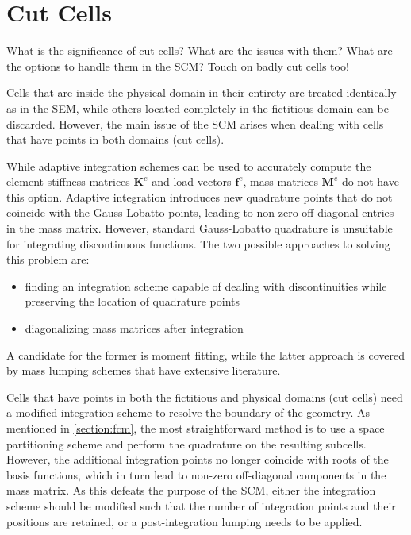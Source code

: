 %
\section{Cut Cells}
\label{section:cutcells}
%

What is the significance of cut cells?
What are the issues with them?
What are the options to handle them in the SCM?
Touch on badly cut cells too!

Cells that are inside the physical domain in their entirety are treated identically as in the SEM, while others located completely in the fictitious domain can be discarded. However, the main issue of the SCM arises when dealing with cells that have points in both domains (cut cells).

While adaptive integration schemes can be used to accurately compute the element stiffness matrices $\mathbf K^e$ and load vectors $\mathbf f^e$, mass matrices $\mathbf M^e$ do not have this option. Adaptive integration introduces new quadrature points that do not coincide with the Gauss-Lobatto points, leading to non-zero off-diagonal entries in the mass matrix. However, standard Gauss-Lobatto quadrature is unsuitable for integrating discontinuous functions. The two possible approaches to solving this problem are:

\begin{itemize}
	\item finding an integration scheme capable of dealing with discontinuities while preserving the location of quadrature points
	\item diagonalizing mass matrices after integration
\end{itemize}

A candidate for the former is moment fitting, while the latter approach is covered by mass lumping schemes that have extensive literature.

Cells that have points in both the fictitious and physical domains (cut cells)
need a modified integration scheme to resolve the boundary of the geometry. As
mentioned in \ref{section:fcm}, the most straightforward method is to use a
space partitioning scheme and perform the quadrature on the resulting subcells.
However, the additional integration points no longer coincide with roots of the
basis functions, which in turn lead to non-zero off-diagonal components in the
mass matrix. As this defeats the purpose of the SCM, either the integration
scheme should be modified such that the number of integration points and their
positions are retained, or a post-integration lumping needs to be applied.
